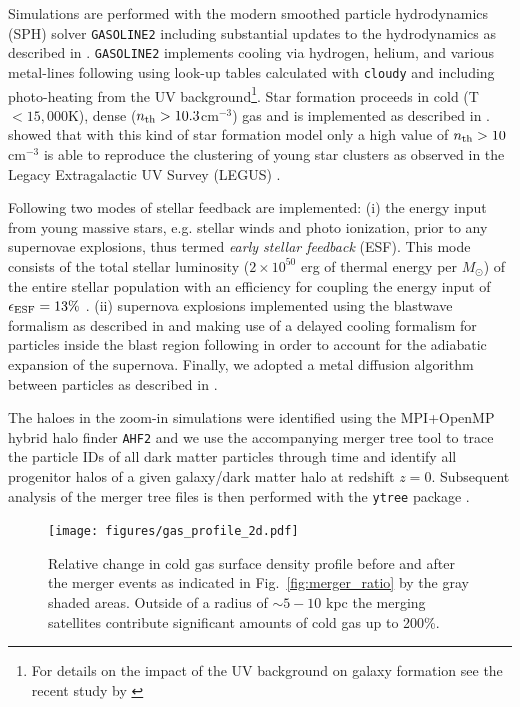 \documentclass[useAMS,usenatbib]{mnras}
\begin{document}
Simulations are performed with the modern smoothed particle hydrodynamics (SPH) solver {\texttt{GASOLINE2}} \citep{Wadsley2017} including substantial updates to the hydrodynamics as described in \citet{Keller2014}. {\texttt{GASOLINE2}} implements cooling via hydrogen, helium, and various metal-lines following \citet{Shen2010} using look-up tables calculated with \texttt{cloudy} \citep[version 07.02;][]{Ferland1998} and including photo-heating from the \citet{Haardt2005} UV background\footnote{For details on the impact of the UV background on galaxy formation see the recent study by \citet{Obreja2019}}. Star formation proceeds in cold (T $< 15,000$K), dense ($n_{\rm  th}  >  10.3$cm$^{-3}$) gas and is implemented as described in \citet{Stinson2006}. \citet{Buck2019a} showed that with this kind of star formation model only a high value of $n_{\rm  th}>10$cm$^{-3}$ \citep[see also][for an extended parameter study]{Dutton2019,Dutton2020} is able to reproduce the clustering of young star clusters as observed in the Legacy Extragalactic UV Survey (LEGUS) \citep{Calzetti2015,Grasha2017}.

Following \citet{Stinson2013} two modes of stellar feedback are implemented: (i) the energy input from young massive stars, e.g. stellar winds and photo ionization, prior to any supernovae explosions, thus termed \textit{early stellar feedback} (ESF). This mode consists of the total stellar luminosity ($2 \times 10^{50}$ erg of thermal energy per $M_{\odot}$) of the entire stellar population with an efficiency for coupling the energy input of $\epsilon_{\rm ESF}=13\%$ \citep{Wang2015}. (ii) supernova explosions implemented using the blastwave formalism as described in \citet{Stinson2006} and making use of a delayed cooling formalism for particles inside the blast region following \citet{McKee1977} in order to account for the adiabatic expansion of the supernova.
Finally, we adopted a metal diffusion algorithm between particles as described in \citet{Wadsley2008}.

The haloes in the zoom-in simulations were identified using the MPI+OpenMP hybrid halo finder \texttt{AHF2} \citep{Knollmann2009} and we use the accompanying merger tree tool to trace the particle IDs of all dark matter particles through time and identify all progenitor halos of a given galaxy/dark matter halo at redshift $z=0$. Subsequent analysis of the merger tree files is then performed with the {\texttt {ytree}} package \citep{ytree}. 

\begin{figure}
    \begin{centering}
        \texttt{[image: figures/gas\_profile\_2d.pdf]}
        \vspace*{-1.75em}
        \caption{
            Relative change in cold gas surface density profile before and after the merger events as indicated in Fig.~\ref{fig:merger_ratio} by the gray shaded areas. Outside of a radius of $\sim5-10$ kpc the merging satellites contribute significant amounts of cold gas up to 200\%.
        }
        \label{fig:surf_den}
    \end{centering}
\end{figure}
\end{document}
